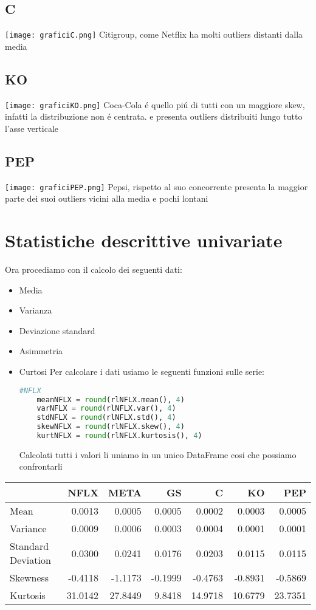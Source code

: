 \documentclass{report}
\begin{document}
\subsection{C}
\texttt{[image: graficiC.png]}
Citigroup, come Netflix ha molti outliers distanti dalla media
\subsection{KO}
\texttt{[image: graficiKO.png]}
Coca-Cola é quello piú di tutti con un maggiore skew, infatti la distribuzione non é centrata. e presenta outliers distribuiti lungo tutto l'asse verticale
\subsection{PEP}
\texttt{[image: graficiPEP.png]}
Pepsi, rispetto al suo concorrente presenta la maggior parte dei suoi outliers vicini alla media e pochi lontani

\section{Statistiche descrittive univariate}
Ora procediamo con il calcolo dei seguenti dati:
\begin{itemize}[leftmargin=30pt, rightmargin=2cm]
\item Media
\item Varianza
\item Deviazione standard
\item Asimmetria
\item Curtosi
Per calcolare i dati usiamo le seguenti funzioni sulle serie:
\begin{lstlisting}[language=python]
    #NFLX
    meanNFLX = round(rlNFLX.mean(), 4)
    varNFLX = round(rlNFLX.var(), 4)
    stdNFLX = round(rlNFLX.std(), 4)
    skewNFLX = round(rlNFLX.skew(), 4)
    kurtNFLX = round(rlNFLX.kurtosis(), 4)
\end{lstlisting}
Calcolati tutti i valori li uniamo in un unico DataFrame cosi che possiamo confrontarli
\end{itemize}
\begin{tabular}{lrrrrrr}
\toprule
{} &     NFLX &     META &      GS &        C &       KO &      PEP \\
\midrule
Mean               &   0.0013 &   0.0005 &  0.0005 &   0.0002 &   0.0003 &   0.0005 \\
Variance           &   0.0009 &   0.0006 &  0.0003 &   0.0004 &   0.0001 &   0.0001 \\
Standard Deviation &   0.0300 &   0.0241 &  0.0176 &   0.0203 &   0.0115 &   0.0115 \\
Skewness           &  -0.4118 &  -1.1173 & -0.1999 &  -0.4763 &  -0.8931 &  -0.5869 \\
Kurtosis           &  31.0142 &  27.8449 &  9.8418 &  14.9718 &  10.6779 &  23.7351 \\
\bottomrule
\end{tabular}
\end{document}
